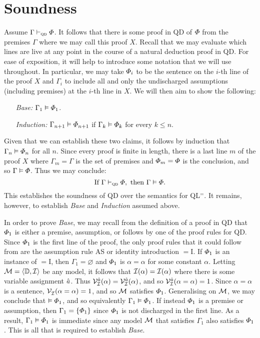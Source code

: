 \section{Soundness}%
  \label{sec:Soundness}

Assume $\Gamma \vdash_{\textsc{qd}} \varPhi$.
It follows that there is some proof in QD of $\varPhi$ from the premises $\Gamma$ where we may call this proof $X$. 
Recall that we may evaluate which lines are live at any point in the course of a natural deduction proof in QD.
For ease of exposition, it will help to introduce some notation that we will use throughout.
In particular, we may take $\varPhi_i$ to be the sentence on the $i$-th line of the proof $X$ and $\Gamma_i$ to include all and only the undischarged assumptions (including premises) at the $i$-th line in $X$.
We will then aim to show the following:
\begin{enumerate}[leftmargin=1.5in]
  \item[\it Base:] $\Gamma_1 \vDash \varPhi_1$.
  \item[\it Induction:] $\Gamma_{n+1} \vDash \varPhi_{n+1}$ if $\Gamma_k \vDash \varPhi_k$ for every $k\leq n$.
\end{enumerate}
Given that we can establish these two claims, it follows by induction that $\Gamma_n \vDash \varPhi_n$ for all $n$.
Since every proof is finite in length, there is a last line $m$ of the proof $X$ where $\Gamma_m=\Gamma$ is the set of premises and $\varPhi_m=\varPhi$ is the conclusion, and so $\Gamma \vDash \varPhi$. 
Thus we may conclude:
  $$\text{If } \Gamma \vdash_{\textsc{qd}} \varPhi, \text{ then } \Gamma \vDash \varPhi.$$
This establishes the soundness of QD over the semantics for QL$^=$.
It remains, however, to establish \textit{Base} and \textit{Induction} assumed above.

In order to prove \textit{Base}, we may recall from the definition of a proof in QD that $\varPhi_1$ is either a premise, assumption, or follows by one of the proof rules for QD. 
Since $\varPhi_1$ is the first line of the proof, the only proof rules that it could follow from are the assumption rule AS or identity introduction $=$I.
If $\varPhi_1$ is an instance of $=$I, then $\Gamma_1=\varnothing$ and $\varPhi_1$ is $\alpha=\alpha$ for some constant $\alpha$. 
Letting $\mathcal{M}=\langle\mathbb{D},\mathcal{I}\rangle$ be any model, it follows that $\mathcal{I}(\alpha)=\mathcal{I}(\alpha)$ where there is some variable assignment $\hat{a}$.
Thus $\mathcal{V}_{\mathcal{I}}^{\hat{a}}(\alpha)=\mathcal{V}_{\mathcal{I}}^{\hat{a}}(\alpha)$, and so $\mathcal{V}_{\mathcal{I}}^{\hat{a}}(\alpha=\alpha)=1$.
Since $\alpha=\alpha$ is a sentence, $\mathcal{V}_{\mathcal{I}}^{}(\alpha=\alpha)=1$, and so $\mathcal{M}$ satisfies $\varPhi_1$.
Generalising on $\mathcal{M}$, we may conclude that $\vDash \varPhi_1$, and so equivalently $\Gamma_1 \vDash \varPhi_1$.
If instead $\varPhi_1$ is a premise or assumption, then $\Gamma_1=\lbrace\varPhi_1\rbrace$ since $\varPhi_1$ is not discharged in the first line.
As a result, $\Gamma_1 \vDash \varPhi_1$ is immediate since any model $\mathcal{M}$ that satisfies $\Gamma_1$ also satisfies $\varPhi_1$.
This is all that is required to establish \textit{Base}.

